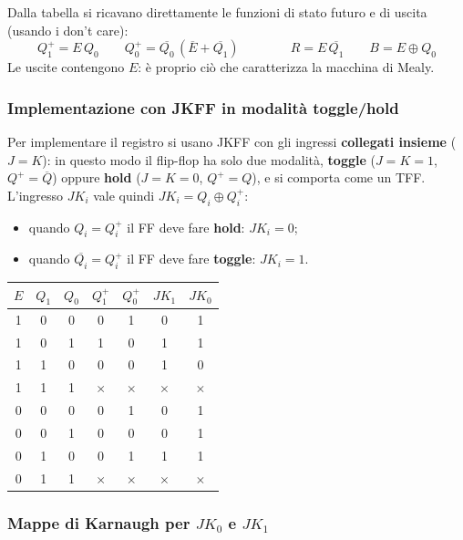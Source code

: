 \noindent Dalla tabella si ricavano direttamente le funzioni di stato futuro e di uscita
(usando i don't care):
\[
Q_1^+ = E\,Q_0 \qquad Q_0^+ = \overline{Q_0}\,(\overline{E}+\overline{Q_1})
\qquad\qquad R = E\,\overline{Q_1} \qquad B = E \oplus Q_0
\]
Le uscite contengono $E$: è proprio ciò che caratterizza la macchina di Mealy.

\subsubsection*{Implementazione con JKFF in modalità toggle/hold}

Per implementare il registro si usano JKFF con gli ingressi \textbf{collegati insieme}
($J=K$): in questo modo il flip-flop ha solo due modalità, \textbf{toggle} ($J=K=1$,
$Q^+=\overline{Q}$) oppure \textbf{hold} ($J=K=0$, $Q^+=Q$), e si comporta come un TFF.
L'ingresso $JK_i$ vale quindi $JK_i = Q_i \oplus Q_i^+$:
\begin{itemize}[leftmargin=1.5em, itemsep=1pt]
    \item quando $Q_i = Q_i^+$ il FF deve fare \textbf{hold}: $JK_i=0$;
    \item quando $\overline{Q_i} = Q_i^+$ il FF deve fare \textbf{toggle}: $JK_i=1$.
\end{itemize}

\begin{center}
\begin{tabular}{c|cc|cc|cc}
\toprule
$E$ & $Q_1$ & $Q_0$ & $Q_1^+$ & $Q_0^+$ & $JK_1$ & $JK_0$ \\
\midrule
1 & 0 & 0 & 0 & 1 & 0 & 1 \\
1 & 0 & 1 & 1 & 0 & 1 & 1 \\
1 & 1 & 0 & 0 & 0 & 1 & 0 \\
1 & 1 & 1 & $\times$ & $\times$ & $\times$ & $\times$ \\
\midrule
0 & 0 & 0 & 0 & 1 & 0 & 1 \\
0 & 0 & 1 & 0 & 0 & 0 & 1 \\
0 & 1 & 0 & 0 & 1 & 1 & 1 \\
0 & 1 & 1 & $\times$ & $\times$ & $\times$ & $\times$ \\
\bottomrule
\end{tabular}
\end{center}

\subsubsection*{Mappe di Karnaugh per $JK_0$ e $JK_1$}

